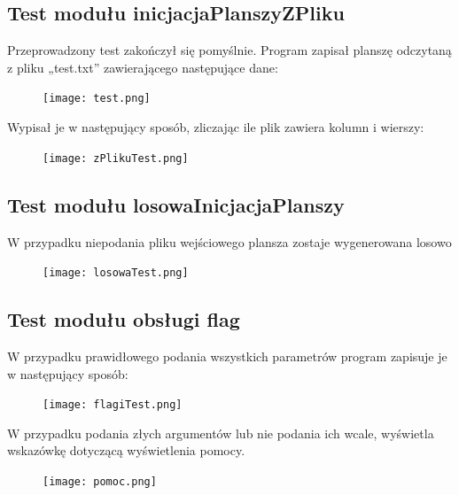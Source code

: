 \documentclass[10pt, oneside]{article}
\begin{document}
\subsection{Test modułu inicjacjaPlanszyZPliku}
Przeprowadzony test zakończył się pomyślnie. Program zapisał planszę odczytaną z pliku „test.txt” zawierającego następujące dane:\\
 
\begin{figure}[H]
	\centering
	\texttt{[image: test.png]}
\end{figure}

Wypisał je w następujący sposób, zliczając ile plik zawiera kolumn i wierszy:\\

\begin{figure}[H]
	\centering
	\texttt{[image: zPlikuTest.png]}
\end{figure}
 

\subsection{Test modułu losowaInicjacjaPlanszy}

W przypadku niepodania pliku wejściowego plansza zostaje wygenerowana losowo\\

\begin{figure}[H]
	\centering
	\texttt{[image: losowaTest.png]}
\end{figure}


\subsection{Test modułu obsługi flag}

W przypadku prawidłowego podania wszystkich parametrów program zapisuje je w następujący sposób:\\

\begin{figure}[H]
	\centering
	\texttt{[image: flagiTest.png]}
\end{figure}
 
W przypadku podania złych argumentów lub nie podania ich wcale, wyświetla wskazówkę dotyczącą wyświetlenia pomocy.\\

\begin{figure}[H]
	\centering
	\texttt{[image: pomoc.png]}
\end{figure}
\end{document}
